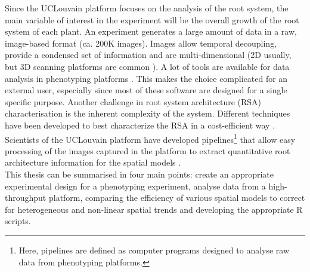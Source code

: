 Since the UCLouvain platform focuses on the analysis of the root system, the main variable of interest in the experiment will be the overall growth of the root system of each plant. 
An experiment generates a large amount of data in a raw, image-based format (ca. 200K images). 
Images allow temporal decoupling, provide a condensed set of information and are multi-dimensional (2D usually, but 3D scanning platforms are common \parencite{mooney_developing_2012}). 
A lot of tools are available for data analysis in phenotyping platforms \parencite{lobet_online_2013}. This makes the choice complicated for an external user, especially since most of these software are designed for a single specific purpose. Another challenge in root system architecture (RSA) characterisation is the inherent complexity of the system. Different techniques have been developed to best characterize the RSA in a cost-efficient way \parencite{pound_rootnav:_2013,lobet_novel_2013}. 
Scientists of the UCLouvain platform have developed pipelines\footnote{Here, pipelines are defined as computer programs designed to analyse raw data from phenotyping platforms.} that allow easy processing of the images captured in the platform to extract quantitative root architecture information for the spatial models \parencite{lobet_novel_2013,lobet_novel_2011}.\\

This thesis can be summarised in four main points: create an appropriate experimental design for a phenotyping experiment, analyse data from a high-throughput platform, comparing the efficiency of various spatial models to correct for heterogeneous and non-linear spatial trends and developing the appropriate R scripts.